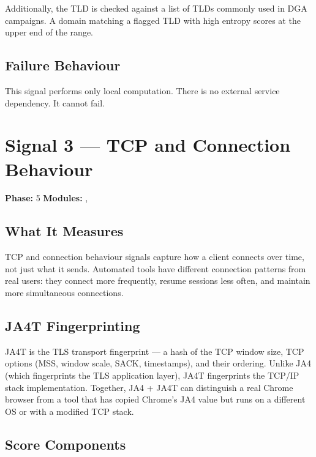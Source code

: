 Additionally, the TLD is checked against a list of TLDs commonly used in DGA campaigns.
A domain matching a flagged TLD with high entropy scores at the upper end of the range.

\subsection{Failure Behaviour}

This signal performs only local computation. There is no external service dependency.
It cannot fail.

\section{Signal 3 — TCP and Connection Behaviour}
\label{sig:tcp}

\textbf{Phase:} 5 \quad \textbf{Modules:} , 

\subsection{What It Measures}

TCP and connection behaviour signals capture how a client connects over time, not just
what it sends. Automated tools have different connection patterns from real users:
they connect more frequently, resume sessions less often, and maintain more simultaneous
connections.

\subsection{JA4T Fingerprinting}

JA4T is the TLS transport fingerprint — a hash of the TCP window size, TCP options
(MSS, window scale, SACK, timestamps), and their ordering. Unlike JA4 (which fingerprints
the TLS application layer), JA4T fingerprints the TCP/IP stack implementation. Together,
JA4 + JA4T can distinguish a real Chrome browser from a tool that has copied Chrome's
JA4 value but runs on a different OS or with a modified TCP stack.

\subsection{Score Components}

